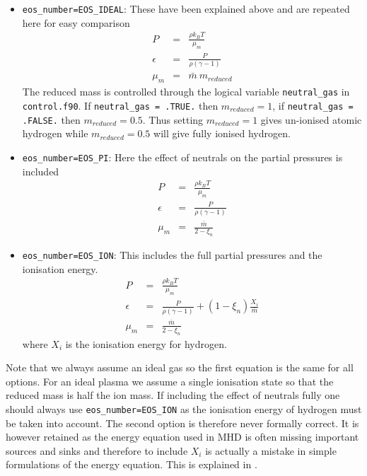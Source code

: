 \documentclass[11pt]{article}
\begin{document}
\begin{itemize}
\item \texttt{eos\_number=EOS\_IDEAL}: These have been explained above and are repeated here for easy comparison
\begin{eqnarray*}
P&=&\frac{\rho k_{B}T}{\mu_m}\\
\epsilon&=&\frac{P}{\rho(\gamma-1)}\\
\mu_m&=&\bar{m}\ m_{reduced}
\end{eqnarray*}       
The reduced mass is controlled through the logical variable {\tt neutral\_gas} in  \texttt{control.f90}. If 
{\tt neutral\_gas = .TRUE.} then $m_{reduced}=1$, if {\tt neutral\_gas = .FALSE.} then $m_{reduced}=0.5$.
Thus setting $m_{reduced}=1$ gives un-ionised atomic hydrogen while $m_{reduced}=0.5$ will give fully ionised hydrogen. 

\item \texttt{eos\_number=EOS\_PI}: Here the effect of neutrals on the partial pressures is included 
\begin{eqnarray*}
P&=&\frac{\rho k_{B}T}{\mu_m}\\
\epsilon&=&\frac{P}{\rho(\gamma-1)}\\
\mu_m&=&\frac{\bar{m}}{2-\xi_n}
\end{eqnarray*}

\item \texttt{eos\_number=EOS\_ION}: This includes the full partial pressures and the ionisation energy.
\begin{eqnarray*}
P&=&\frac{\rho k_{B}T}{\mu_m}\\
\epsilon&=&\frac{P}{\rho(\gamma-1)}+(1-\xi_n)\frac{X_i}{\bar{m}}\\
\mu_m&=&\frac{\bar{m}}{2-\xi_n}
\end{eqnarray*}
where $X_i$ is the ionisation energy for hydrogen.

\end{itemize}

Note that we always assume an ideal gas so the first equation is the same for all options. For an ideal plasma we assume a single ionisation state so that the reduced mass is half the ion mass. If including the effect of neutrals fully one should always use \texttt{eos\_number=EOS\_ION} as the ionisation energy of hydrogen must be taken into account. The second option is therefore never formally correct. It is however retained as the energy equation used in MHD is often missing important sources and sinks and therefore to include $X_i$ is actually a mistake in simple formulations of the energy equation. This is explained in \cite{flux-emergence}.
\end{document}
